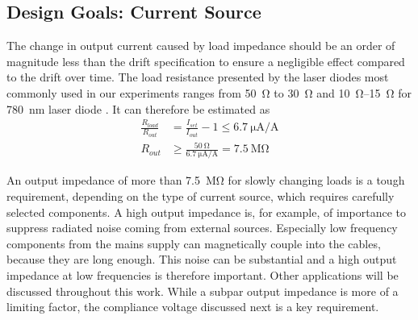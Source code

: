 
\subsection{Design Goals: Current Source}
The change in output current caused by load impedance should be an order of magnitude less than the drift specification to ensure a negligible effect compared to the drift over time. The load resistance presented by the laser diodes most commonly used in our experiments ranges from \qty{50}{\ohm} \cite{datasheet_osram_pl450b} to \qty{30}{\ohm} \cite{datasheet_adl_785} and \qtyrange{10}{15}{\ohm} for \qty{780}{\nm} laser diode \cite{datasheet_sharp_780nm,datasheet_thorlabs_780nm}. It can therefore be estimated as
\begin{align}
    \frac{R_{load}}{R_{out}} &= \frac{I_{set}}{I_{out}} - 1 \leq \qty[per-mode = symbol]{6.7}{\uA \per \A} \nonumber\\
    R_{out} &\geq \frac{\qty{50}{\ohm}}{\qty[per-mode = symbol]{6.7}{\uA \per \A}} = \qty{7.5}{\mega \ohm}
\end{align}

An output impedance of more than \qty{7.5}{\mega \ohm} for slowly changing loads is a tough requirement, depending on the type of current source, which requires carefully selected components. A high output impedance is, for example, of importance to suppress radiated noise coming from external sources. Especially low frequency components from the mains supply can magnetically couple into the cables, because they are long enough. This noise can be substantial and a high output impedance at low frequencies is therefore important. Other applications will be discussed throughout this work. While a subpar output impedance is more of a limiting factor, the compliance voltage discussed next is a key requirement.

